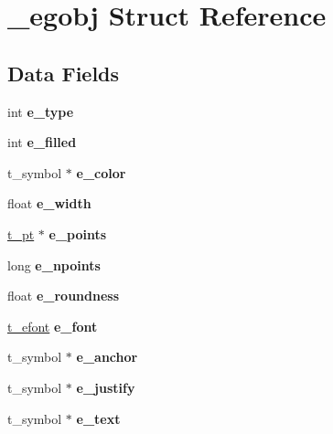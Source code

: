 \hypertarget{struct__egobj}{\section{\-\_\-egobj Struct Reference}
\label{struct__egobj}
}
\subsection*{Data Fields}
\begin{DoxyCompactItemize}
\item 
\hypertarget{struct__egobj_a18c9e48ccb18cdbc171c5fc149536e7b}{int {\bfseries e\-\_\-type}}\label{struct__egobj_a18c9e48ccb18cdbc171c5fc149536e7b}

\item 
\hypertarget{struct__egobj_ae13e50cb319a060b3e612c39d0fc698d}{int {\bfseries e\-\_\-filled}}\label{struct__egobj_ae13e50cb319a060b3e612c39d0fc698d}

\item 
\hypertarget{struct__egobj_a13dfb00aea95e0dc5b9d1297260a9280}{t\-\_\-symbol $\ast$ {\bfseries e\-\_\-color}}\label{struct__egobj_a13dfb00aea95e0dc5b9d1297260a9280}

\item 
\hypertarget{struct__egobj_abe0dac7e3167ea1dd6c4e238ab4ab8bd}{float {\bfseries e\-\_\-width}}\label{struct__egobj_abe0dac7e3167ea1dd6c4e238ab4ab8bd}

\item 
\hypertarget{struct__egobj_a579eafd42827c9bdcddc613774309ad3}{\hyperlink{struct__pt}{t\-\_\-pt} $\ast$ {\bfseries e\-\_\-points}}\label{struct__egobj_a579eafd42827c9bdcddc613774309ad3}

\item 
\hypertarget{struct__egobj_a216eff6ab0216b35e215bd1c1b8fb0d0}{long {\bfseries e\-\_\-npoints}}\label{struct__egobj_a216eff6ab0216b35e215bd1c1b8fb0d0}

\item 
\hypertarget{struct__egobj_ab2c5a6f93a125c4862295e28aad05a74}{float {\bfseries e\-\_\-roundness}}\label{struct__egobj_ab2c5a6f93a125c4862295e28aad05a74}

\item 
\hypertarget{struct__egobj_a4bf02b4e1a6c0c7723b5ed198f45e0b0}{\hyperlink{struct__efont}{t\-\_\-efont} {\bfseries e\-\_\-font}}\label{struct__egobj_a4bf02b4e1a6c0c7723b5ed198f45e0b0}

\item 
\hypertarget{struct__egobj_a26003aea4ac1d50f79a5db2e05599222}{t\-\_\-symbol $\ast$ {\bfseries e\-\_\-anchor}}\label{struct__egobj_a26003aea4ac1d50f79a5db2e05599222}

\item 
\hypertarget{struct__egobj_a41dc1b542ee19a3171a52480dff2c664}{t\-\_\-symbol $\ast$ {\bfseries e\-\_\-justify}}\label{struct__egobj_a41dc1b542ee19a3171a52480dff2c664}

\item 
\hypertarget{struct__egobj_a5f97b246c0da885ff0cd44b32a967338}{t\-\_\-symbol $\ast$ {\bfseries e\-\_\-text}}\label{struct__egobj_a5f97b246c0da885ff0cd44b32a967338}

\end{DoxyCompactItemize}


